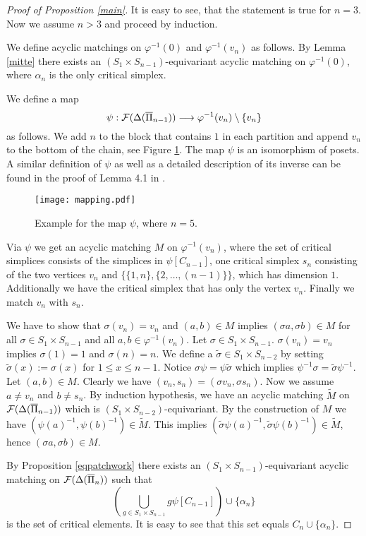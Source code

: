 \documentclass{elsarticle}
\begin{document}
\begin{proof}[Proof of Proposition \ref{main}]
It is easy to see, that the statement is true for $n=3$. Now we assume $n>3$ and proceed by induction.

We define acyclic matchings on $\varphi^{-1}(0)$ and $\varphi^{-1}(v_n)$ as follows. By Lemma \ref{mitte} there exists an $(S_1\times S_{n-1})$-equivariant acyclic matching on $\varphi^{-1}(0)$, where $\alpha_n$ is the only critical simplex.

We define a map
\[
\psi:{\cal F}(\Delta(\overline{\Pi}_{n-1}))\longrightarrow\varphi^{-1}(v_n)\setminus\{v_n\}
\]
as follows. We add $n$ to the block that contains $1$ in each partition and append $v_n$ to the bottom of the chain, see Figure \ref{exmapping}. The map $\psi$ is an isomorphism of posets. A similar definition of $\psi$ as well as a detailed description of its inverse can be found in the proof of Lemma 4.1 in \cite{donau}.
\begin{figure}[ht]
\centering
\texttt{[image: mapping.pdf]}
\caption{Example for the map $\psi$, where $n=5$.} %
\label{exmapping}
\end{figure}

Via $\psi$ we get an acyclic matching $M$ on $\varphi^{-1}(v_n)$, where the set of critical simplices consists of the simplices in $\psi[C_{n-1}]$, one critical simplex $s_n$ consisting of the two vertices $v_n$ and $\{\{1,n\},\{2,\dots,(n-1)\}\}$, which has dimension $1$. Additionally we have the critical simplex that has only the vertex $v_n$. Finally we match $v_n$ with $s_n$.

We have to show that $\sigma(v_n)=v_n$ and $(a,b)\in M$ implies $(\sigma a,\sigma b)\in M$ for all $\sigma\in S_1\times S_{n-1}$ and all $a,b\in\varphi^{-1}(v_n)$. Let $\sigma\in S_1\times S_{n-1}$. $\sigma(v_n)=v_n$ implies $\sigma(1)=1$ and $\sigma(n)=n$. We define a $\widetilde\sigma\in S_1\times S_{n-2}$ by setting $\widetilde\sigma(x):=\sigma(x)$ for $1\leq x\leq n-1$. Notice $\sigma\psi=\psi\widetilde\sigma$ which implies $\psi^{-1}\sigma=\widetilde\sigma\psi^{-1}$. Let $(a,b)\in M$. Clearly we have $(v_n,s_n)=(\sigma v_n,\sigma s_n)$. Now we assume $a\not=v_n$ and $b\not=s_n$. By induction hypothesis, we have an acyclic matching $\widetilde M$ on ${\cal F}(\Delta(\overline{\Pi}_{n-1}))$ which is $(S_1\times S_{n-2})$-equivariant. By the construction of $M$ we have $(\psi(a)^{-1},\psi(b)^{-1})\in\widetilde M$. This implies $(\widetilde\sigma\psi(a)^{-1},\widetilde\sigma\psi(b)^{-1})\in\widetilde M$, hence $(\sigma a,\sigma b)\in M$.

By Proposition \ref{eqpatchwork} there exists an $(S_1\times S_{n-1})$-equivariant acyclic matching on ${\cal F}(\Delta(\overline{\Pi}_n))$ such that
\[
\left(\bigcup_{g\in S_1\times S_{n-1}}g\psi[C_{n-1}]\right)\cup\{\alpha_n\}
\]
is the set of critical elements. It is easy to see that this set equals $C_n\cup\{\alpha_n\}$.
\end{proof}
\end{document}
